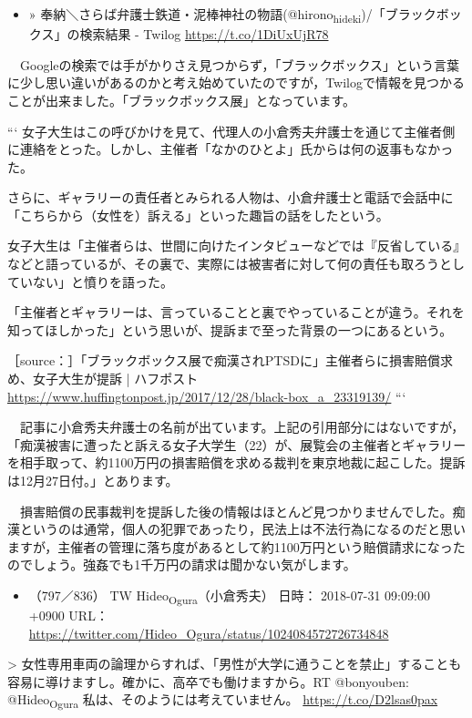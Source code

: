 \documentclass[]{ltjarticle}
\begin{document}
\begin{itemize}
\item » 奉納＼さらば弁護士鉄道・泥棒神社の物語(@hirono\textsubscript{hideki})/「ブラックボックス」の検索結果 - Twilog \url{https://t.co/1DiUxUjR78}
\end{itemize}

　Googleの検索では手がかりさえ見つからず，「ブラックボックス」という言葉に少し思い違いがあるのかと考え始めていたのですが，Twilogで情報を見つかることが出来ました。「ブラックボックス展」となっています。

```
女子大生はこの呼びかけを見て、代理人の小倉秀夫弁護士を通じて主催者側に連絡をとった。しかし、主催者「なかのひとよ」氏からは何の返事もなかった。

さらに、ギャラリーの責任者とみられる人物は、小倉弁護士と電話で会話中に「こちらから（女性を）訴える」といった趣旨の話をしたという。

女子大生は「主催者らは、世間に向けたインタビューなどでは『反省している』などと語っているが、その裏で、実際には被害者に対して何の責任も取ろうとしていない」と憤りを語った。

「主催者とギャラリーは、言っていることと裏でやっていることが違う。それを知ってほしかった」という思いが、提訴まで至った背景の一つにあるという。

［source：］「ブラックボックス展で痴漢されPTSDに」主催者らに損害賠償求め、女子大生が提訴 | ハフポスト \url{https://www.huffingtonpost.jp/2017/12/28/black-box\_a\_23319139/}
```

　記事に小倉秀夫弁護士の名前が出ています。上記の引用部分にはないですが，「痴漢被害に遭ったと訴える女子大学生（22）が、展覧会の主催者とギャラリーを相手取って、約1100万円の損害賠償を求める裁判を東京地裁に起こした。提訴は12月27日付。」とあります。

　損害賠償の民事裁判を提訴した後の情報はほとんど見つかりませんでした。痴漢というのは通常，個人の犯罪であったり，民法上は不法行為になるのだと思いますが，主催者の管理に落ち度があるとして約1100万円という賠償請求になったのでしょう。強姦でも1千万円の請求は聞かない気がします。

\begin{itemize}
\item （797／836） TW Hideo\textsubscript{Ogura}（小倉秀夫） 日時： 2018-07-31 09:09:00 +0900 URL： \url{https://twitter.com/Hideo\_Ogura/status/1024084572726734848}
\end{itemize}

> 女性専用車両の論理からすれば、「男性が大学に通うことを禁止」することも容易に導けますし。確かに、高卒でも働けますから。RT @bonyouben: @Hideo\textsubscript{Ogura} 私は、そのようには考えていません。 \url{https://t.co/D2lsas0pax}
\end{document}
